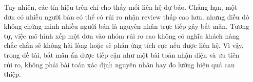Tuy nhiên, các tín hiệu trên chỉ cho thấy mối liên hệ dự báo. Chẳng hạn, một đơn có nhiều người bán có thể có rủi ro nhận review thấp cao hơn, nhưng điều đó không chứng minh nhiều người bán là nguyên nhân trực tiếp gây bất mãn. Tương tự, việc mô hình xếp một đơn vào nhóm rủi ro cao không có nghĩa khách hàng chắc chắn sẽ không hài lòng hoặc sẽ phản ứng tích cực nếu được liên hệ. Vì vậy, trong đề tài, bất mãn ẩn được tiếp cận như một bài toán nhận diện và ưu tiên rủi ro, không phải bài toán xác định nguyên nhân hay đo lường hiệu quả can thiệp.
